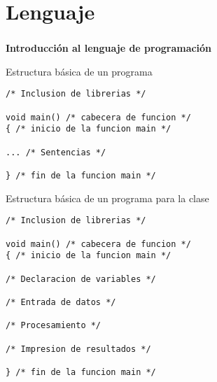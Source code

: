 \setlength{\parskip}{\baselineskip} 
\section{Lenguaje}

\begin{frame}[c] 
\frametitle{}
\centering
\huge \textbf{Introducción al lenguaje de programación}
\end{frame}


\begin{frame}[t, fragile]{Estructura básica de un programa}
	\begin{lstlisting}
/* Inclusion de librerias */

void main() /* cabecera de funcion */
{ /* inicio de la funcion main */

... /* Sentencias */

} /* fin de la funcion main */
\end{lstlisting}
\end{frame}


\begin{frame}[fragile]{Estructura básica de un programa para la clase}
	\begin{lstlisting}
/* Inclusion de librerias */

void main() /* cabecera de funcion */
{ /* inicio de la funcion main */

/* Declaracion de variables */

/* Entrada de datos */

/* Procesamiento */

/* Impresion de resultados */

} /* fin de la funcion main */
\end{lstlisting}
\end{frame}


